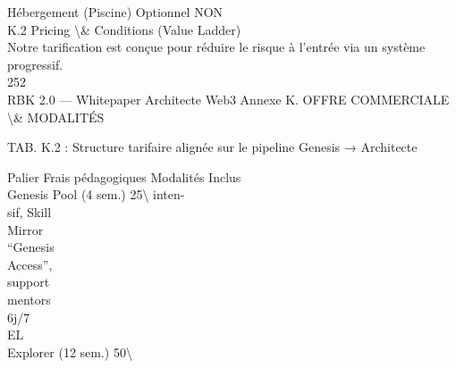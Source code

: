 \documentclass[12pt,landscape,a4paper]{article}
\begin{document}
Hébergement (Piscine)                                                               Optionnel NON\\
\vspace{0.5em}
\vspace{0.5em}
\vspace{0.5em}
K.2 Pricing \textbackslash{}& Conditions (Value Ladder)\\
Notre tarification est conçue pour réduire le risque à l’entrée via un système progressif.\\
\vspace{0.5em}
\vspace{0.5em}
\vspace{0.5em}
\vspace{0.5em}
252\\
RBK 2.0 — Whitepaper Architecte Web3                                                         Annexe K. OFFRE COMMERCIALE \textbackslash{}& MODALITÉS\\
\vspace{0.5em}
\vspace{0.5em}
\begin{center}\begin{tabular}TAB. K.2 : Structure tarifaire alignée sur le pipeline Genesis → Architecte\end{tabular}\end{center}
\vspace{0.5em}
\vspace{0.5em}
Palier                                 Frais pédagogiques                 Modalités                                               Inclus\\
Genesis Pool (4 sem.)                  25\textbackslash{}%
inten-\\
sif, Skill\\
Mirror\\
“Genesis\\
Access”,\\
support\\
mentors\\
6j/7\\
\vspace{0.5em}
\vspace{0.5em}
\vspace{0.5em}
\vspace{0.5em}
EL\\
Explorer (12 sem.)                  50\textbackslash{}%
\end{document}
